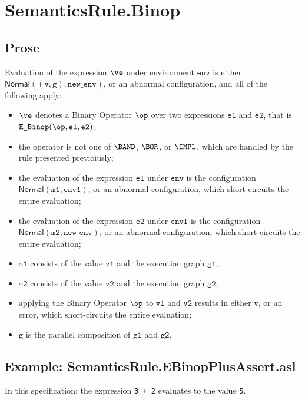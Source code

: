 \documentclass{book}
\newcommand\ProseOrAbnormal[0]{or an abnormal configuration, which short-circuits the entire evaluation}
\newcommand\Normal[0]{\textsf{Normal}}
\newcommand\newenv[0]{\texttt{new\_env}}
\newcommand\env[0]{\texttt{env}}
\newcommand\envone[0]{\texttt{env1}}
\newcommand\vg[0]{\texttt{g}}
\newcommand\vv[0]{\texttt{v}}
\newcommand\vvone[0]{\texttt{v1}}
\newcommand\vvtwo[0]{\texttt{v2}}
\newcommand\vmone[0]{\texttt{m1}}
\newcommand\vmtwo[0]{\texttt{m2}}
\newcommand\veone[0]{\texttt{e1}}
\newcommand\vetwo[0]{\texttt{e2}}
\newcommand\vgone[0]{\texttt{g1}}
\newcommand\vgtwo[0]{\texttt{g2}}
\begin{document}
\section{SemanticsRule.Binop \label{sec:SemanticsRule.Binop}}

  \subsection{Prose}
  Evaluation of the expression $\ve$ under environment $\env$ is either $\Normal((\vv, \vg), \newenv)$,
  or an abnormal configuration, and all of the following apply:
  \begin{itemize}
    \item $\ve$ denotes a Binary Operator $\op$ over two expressions $\veone$ and $\vetwo$,
    that is $\texttt{E\_Binop}(\op, \veone, \vetwo)$;
    \item the operator is not one of $\BAND$, $\BOR$, or $\IMPL$, which are handled by the
    rule presented previoiusly;
    \item the evaluation of the expression $\veone$ under $\env$ is the configuration $\Normal(\vmone, \envone)$,
    \ProseOrAbnormal;
    \item the evaluation of the expression $\vetwo$ under $\envone$ is the configuration $\Normal(\vmtwo, \newenv)$,
    \ProseOrAbnormal;
    \item $\vmone$ consists of the value $\vvone$ and the execution graph $\vgone$;
    \item $\vmtwo$ consists of the value $\vvtwo$ and the execution graph $\vgtwo$;
    \item applying the Binary Operator $\op$ to $\vvone$ and $\vvtwo$ results in either $\vv$,
    or an error, which short-circuits the entire evaluation;
    \item $\vg$ is the parallel composition of $\vgone$ and $\vgtwo$.
  \end{itemize}

  \subsection{Example: SemanticsRule.EBinopPlusAssert.asl}
    In this specification:
    the expression \texttt{3 + 2} evaluates to the value \texttt{5}.
\end{document}
